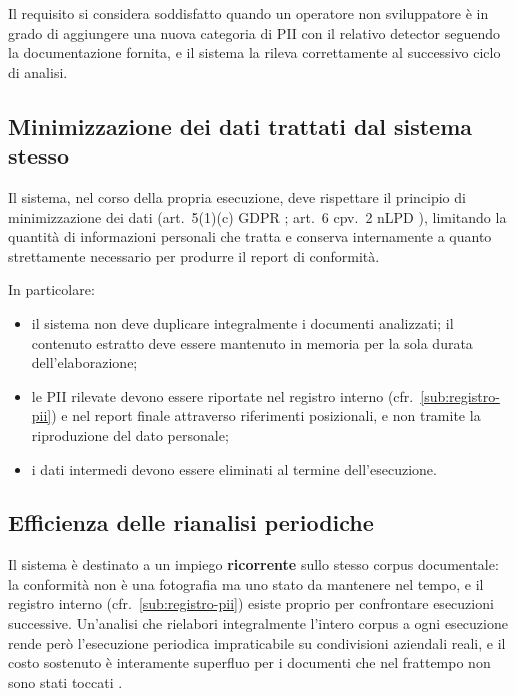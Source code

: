 Il requisito si considera soddisfatto quando un operatore non sviluppatore è in grado di aggiungere una nuova categoria di PII con il relativo detector seguendo la documentazione fornita, e il sistema la rileva correttamente al successivo ciclo di analisi.

\subsection{Minimizzazione dei dati trattati dal sistema stesso}
\label{sub:minimizzazione}
Il sistema, nel corso della propria esecuzione, deve rispettare il principio di minimizzazione dei dati (art.~5(1)(c) GDPR \cite{RegolamentoUE20162016}; art.~6 cpv.~2 nLPD \cite{RS2351Legge}), limitando la quantità di informazioni personali che tratta e conserva internamente a quanto strettamente necessario per produrre il report di conformità. \medskip

In particolare:
\begin{itemize}
	\item il sistema non deve duplicare integralmente i documenti analizzati; il contenuto estratto deve essere mantenuto in memoria per la sola durata dell'elaborazione;
	\item le PII rilevate devono essere riportate nel registro interno (cfr.~\ref{sub:registro-pii}) e nel report finale attraverso riferimenti posizionali, e non tramite la riproduzione del dato personale;
	\item i dati intermedi devono essere eliminati al termine dell'esecuzione.
\end{itemize}

\subsection{Efficienza delle rianalisi periodiche}
\label{sub:rianalisi-incrementale}
Il sistema è destinato a un impiego \textbf{ricorrente} sullo stesso corpus documentale: la conformità non è una fotografia ma uno stato da mantenere nel tempo, e il registro interno (cfr.~\ref{sub:registro-pii}) esiste proprio per confrontare esecuzioni successive. Un'analisi che rielabori integralmente l'intero corpus a ogni esecuzione rende però l'esecuzione periodica impraticabile su condivisioni aziendali reali, e il costo sostenuto è interamente superfluo per i documenti che nel frattempo non sono stati toccati \cite{OverviewVaronisAIPowereda}. \medskip

